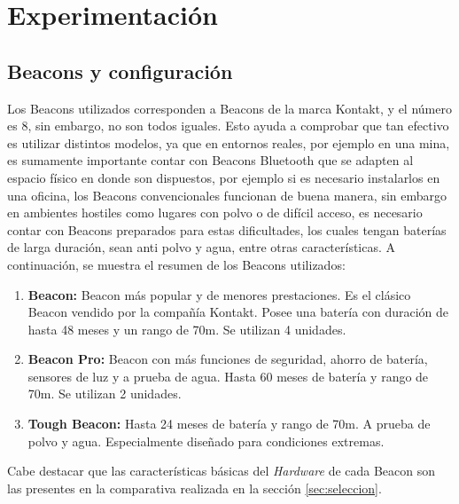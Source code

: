 \chapter{Experimentación}

\section{Beacons y configuración}

Los Beacons utilizados corresponden a Beacons de la marca Kontakt, y el número es 8, sin embargo, no son todos iguales. Esto ayuda a comprobar que tan efectivo es utilizar distintos modelos, ya que en entornos reales, por ejemplo en una mina, es sumamente importante contar con Beacons Bluetooth que se adapten al espacio físico en donde son dispuestos, por ejemplo si es necesario instalarlos en una oficina, los Beacons convencionales funcionan de buena manera, sin embargo en ambientes hostiles como lugares con polvo o de difícil acceso, es necesario contar con Beacons preparados para estas dificultades, los cuales tengan baterías de larga duración, sean anti polvo y agua, entre otras características. A continuación, se muestra el resumen de los Beacons utilizados:

\begin{enumerate}
\item \textbf{Beacon: } Beacon más popular y de menores prestaciones. Es el clásico Beacon vendido por la compañía Kontakt. Posee una batería con duración de hasta 48 meses y un rango de 70m. Se utilizan 4 unidades.

\item \textbf{Beacon Pro: } Beacon con más funciones de seguridad, ahorro de batería, sensores de luz y a prueba de agua. Hasta 60 meses de batería y rango de 70m. Se utilizan 2 unidades.

\item \textbf{Tough Beacon: } Hasta 24 meses de batería y rango de 70m. A prueba de polvo y agua. Especialmente diseñado para condiciones extremas.


\end{enumerate}

Cabe destacar que las características básicas del \textit{Hardware} de cada Beacon son las presentes en la comparativa realizada en la sección \ref{sec:seleccion}.

